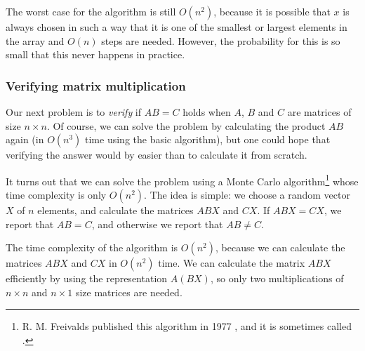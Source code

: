 The worst case for the algorithm is still $O(n^2)$,
because it is possible that $x$ is always chosen
in such a way that it is one of the smallest or largest
elements in the array and $O(n)$ steps are needed.
However, the probability for this is so small
that this never happens in practice.

\subsubsection{Verifying matrix multiplication}


Our next problem is to \emph{verify}
if $AB=C$ holds when $A$, $B$ and $C$
are matrices of size $n \times n$.
Of course, we can solve the problem
by calculating the product $AB$ again
(in $O(n^3)$ time using the basic algorithm),
but one could hope that verifying the
answer would by easier than to calculate it from scratch.

It turns out that we can solve the problem
using a Monte Carlo algorithm\footnote{R. M. Freivalds published
this algorithm in 1977 \cite{fre77}, and it is sometimes
called  .} whose
time complexity is only $O(n^2)$.
The idea is simple: we choose a random vector
$X$ of $n$ elements, and calculate the matrices
$ABX$ and $CX$. If $ABX=CX$, we report that $AB=C$,
and otherwise we report that $AB \neq C$.

The time complexity of the algorithm is
$O(n^2)$, because we can calculate the matrices
$ABX$ and $CX$ in $O(n^2)$ time.
We can calculate the matrix $ABX$ efficiently
by using the representation $A(BX)$, so only two
multiplications of $n \times n$ and $n \times 1$
size matrices are needed.


